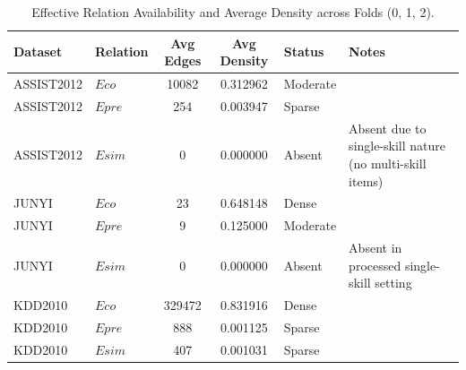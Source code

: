 \begin{table}[h]
\centering
\caption{Effective Relation Availability and Average Density across Folds (0, 1, 2).}
\label{tab:effective_relation_availability}
\begin{tabular}{llccll}
\toprule
Dataset & Relation & Avg Edges & Avg Density & Status & Notes \\
\midrule
ASSIST2012 & $Eco$ & 10082 & 0.312962 & Moderate &  \\
ASSIST2012 & $Epre$ & 254 & 0.003947 & Sparse &  \\
ASSIST2012 & $Esim$ & 0 & 0.000000 & Absent & Absent due to single-skill nature (no multi-skill items) \\
JUNYI & $Eco$ & 23 & 0.648148 & Dense &  \\
JUNYI & $Epre$ & 9 & 0.125000 & Moderate &  \\
JUNYI & $Esim$ & 0 & 0.000000 & Absent & Absent in processed single-skill setting \\
KDD2010 & $Eco$ & 329472 & 0.831916 & Dense &  \\
KDD2010 & $Epre$ & 888 & 0.001125 & Sparse &  \\
KDD2010 & $Esim$ & 407 & 0.001031 & Sparse &  \\
\bottomrule
\end{tabular}
\end{table}
